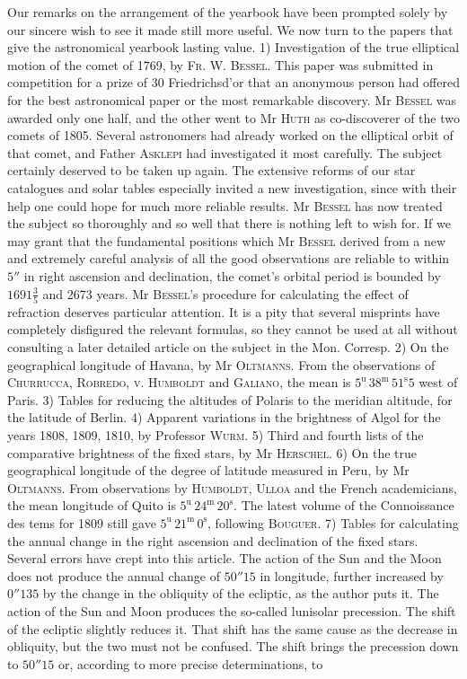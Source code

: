 Our remarks on the arrangement of the yearbook have been prompted solely by our sincere wish to see it made still more useful. We now turn to the papers that give the astronomical yearbook lasting value. 1) Investigation of the true elliptical motion of the comet of 1769, by \textsc{Fr. W. Bessel}. This paper was submitted in competition for a prize of 30 Friedrichsd’or that an anonymous person had offered for the best astronomical paper or the most remarkable discovery. Mr \textsc{Bessel} was awarded only one half, and the other went to Mr \textsc{Huth} as co-discoverer of the two comets of 1805. Several astronomers had already worked on the elliptical orbit of that comet, and Father \textsc{Asklepi} had investigated it most carefully. The subject certainly deserved to be taken up again. The extensive reforms of our star catalogues and solar tables especially invited a new investigation, since with their help one could hope for much more reliable results. Mr \textsc{Bessel} has now treated the subject so thoroughly and so well that there is nothing left to wish for. If we may grant that the fundamental positions which Mr \textsc{Bessel} derived from a new and extremely careful analysis of all the good observations are reliable to within $5''$ in right ascension and declination, the comet’s orbital period is bounded by $1691\frac{3}{5}$ and 2673 years. Mr \textsc{Bessel}’s procedure for calculating the effect of refraction deserves particular attention. It is a pity that several misprints have completely disfigured the relevant formulas, so they cannot be used at all without consulting a later detailed article on the subject in the Mon. Corresp. 2) On the geographical longitude of Havana, by Mr \textsc{Oltmanns}. From the observations of \textsc{Churrucca}, \textsc{Robredo}, \textsc{v. Humboldt} and \textsc{Galiano}, the mean is $5^{\mathrm u}\,38^{\mathrm m}\,51^{\mathrm s}5$ west of Paris. 3) Tables for reducing the altitudes of Polaris to the meridian altitude, for the latitude of Berlin. 4) Apparent variations in the brightness of Algol for the years 1808, 1809, 1810, by Professor \textsc{Wurm}. 5) Third and fourth lists of the comparative brightness of the fixed stars, by Mr \textsc{Herschel}. 6) On the true geographical longitude of the degree of latitude measured in Peru, by Mr \textsc{Oltmanns}. From observations by \textsc{Humboldt}, \textsc{Ulloa} and the French academicians, the mean longitude of Quito is $5^{\mathrm u}\,24^{\mathrm m}\,20^{\mathrm s}$. The latest volume of the Connoissance des tems for 1809 still gave $5^{\mathrm u}\,21^{\mathrm m}\,0^{\mathrm s}$, following \textsc{Bouguer}. 7) Tables for calculating the annual change in the right ascension and declination of the fixed stars. Several errors have crept into this article. The action of the Sun and the Moon does not produce the annual change of $50''15$ in longitude, further increased by $0''135$ by the change in the obliquity of the ecliptic, as the author puts it. The action of the Sun and Moon produces the so-called lunisolar precession. The shift of the ecliptic slightly reduces it. That shift has the same cause as the decrease in obliquity, but the two must not be confused. The shift brings the precession down to $50''15$ or, according to more precise determinations, to 